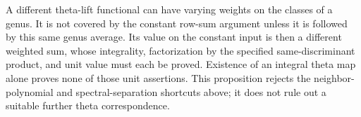 A different theta-lift functional can have varying weights on the
classes of a genus.  It is not covered by the constant row-sum argument
unless it is followed by this same genus average.  Its value on the
constant input is then a different weighted sum, whose integrality,
factorization by the specified same-discriminant product, and unit
value must each be proved.  Existence of an integral theta map alone
proves none of those unit assertions.  This proposition rejects the
neighbor-polynomial and spectral-separation shortcuts above; it does
not rule out a suitable further theta correspondence.

